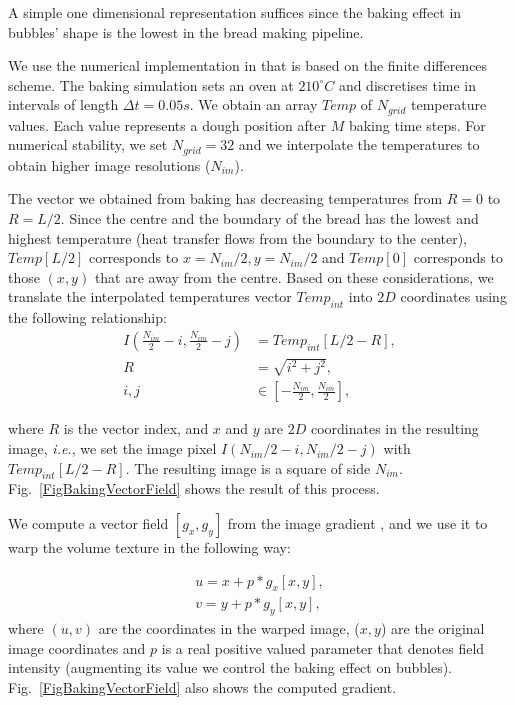 \documentclass[final,5p,times]{elsarticle}
\begin{document}
{A simple one dimensional representation suffices \cite{Purlis2010,Powathil2004}  since the baking effect in bubbles' shape is the lowest in the bread making pipeline. 

We use the numerical implementation in \cite{Powathil2004} that is based on the finite differences scheme. The baking simulation sets an oven at $210  ^{\circ}C$ and discretises time in intervals of length $\Delta t = 0.05s$.  We obtain an array $Temp$ of $N_{grid}$ temperature values. Each value represents a dough position after $M$ baking time steps. For numerical stability, we set $N_{grid}=32$ and we interpolate the temperatures to obtain higher image resolutions ($N_{im}$).


The vector we obtained from baking has decreasing temperatures from $R = 0$ to $R = L/2$. Since the centre and the boundary of the bread has the lowest and highest temperature (heat transfer flows from the boundary to the center), $Temp[L/2]$ corresponds to $x = N_{im}/2, y=N_{im}/2$ and $Temp[0]$ corresponds to those $(x,y)$ that are away from the centre. Based on these considerations, we translate the interpolated temperatures vector $Temp_{int}$ into $2D$ coordinates using the following relationship:
\begin{align}
\displaystyle I(\frac{N_{im}}{2}-i,\frac{N_{im}}{2}-j) &= Temp_{int}[L/2-R], \\
R &= \sqrt{i^{2}+ j^{2}}, \\
i, j &\in [-\frac{N_{im}}{2},\frac{N_{im}}{2}],
\end{align}


\noindent where $R$ is the vector index, and $x$ and $y$ are $2D$ coordinates in the resulting image, {\em i.e.}, we set the image pixel $I(N_{im}/2-i,N_{im}/2-j)$ with $Temp_{int}[L/2-R]$.  The resulting image is a square of side $N_{im}$. Fig.~\ref{FigBakingVectorField} shows the result of this process.

We compute a vector field $[g_{x},g_{y}]$ from the image gradient \cite{Gonzalez2006}, and we use it to warp the volume texture in the following way:

\begin{align}
u = x+p*g_{x}[x,y],\\
v = y+p*g_{y}[x,y],
\end{align}
\noindent where $(u,v)$ are the coordinates in the warped image, ($x,y$) are the original image coordinates and $p$ is a real positive valued parameter that denotes field intensity (augmenting its value we control the baking effect on bubbles). Fig.~\ref{FigBakingVectorField} also shows the computed gradient.


}
\end{document}
